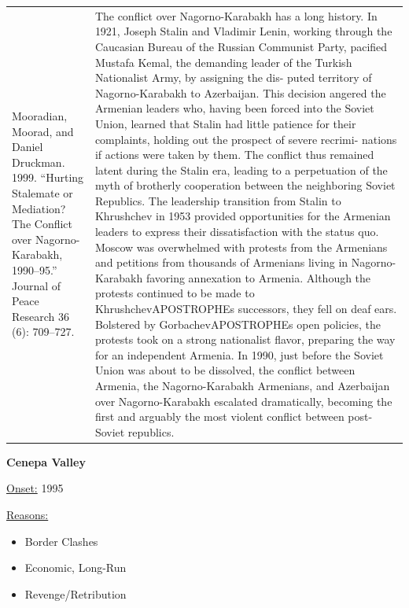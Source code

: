 {\begin{longtable}{p{}p{}}
Mooradian, Moorad, and Daniel Druckman. 1999. “Hurting Stalemate or Mediation? The Conflict over Nagorno-Karabakh, 1990–95.” Journal of Peace Research 36 (6): 709–727. & The conflict over Nagorno-Karabakh has a long history. In 1921, Joseph Stalin and Vladimir Lenin, working through the Caucasian Bureau of the Russian Communist Party, pacified Mustafa Kemal, the demanding leader of the Turkish Nationalist Army, by assigning the dis- puted territory of Nagorno-Karabakh to Azerbaijan. This decision angered the Armenian leaders who, having been forced into the Soviet Union, learned that Stalin had little patience for their complaints, holding out the prospect of severe recrimi- nations if actions were taken by them. The conflict thus remained latent during the Stalin era, leading to a perpetuation of the myth of brotherly cooperation between the neighboring Soviet Republics. The leadership transition from Stalin to Khrushchev in 1953 provided opportunities for the Armenian leaders to express their dissatisfaction with the status quo. Moscow was overwhelmed with protests from the Armenians and petitions from thousands of Armenians living in Nagorno-Karabakh favoring annexation to Armenia. Although the protests continued to be made to KhrushchevAPOSTROPHEs successors, they fell on deaf ears. Bolstered by GorbachevAPOSTROPHEs open policies, the protests took on a strong nationalist flavor, preparing the way for an independent Armenia. In 1990, just before the Soviet Union was about to be dissolved, the conflict between Armenia, the Nagorno-Karabakh Armenians, and Azerbaijan over Nagorno-Karabakh escalated dramatically, becoming the first and arguably the most violent conflict between post-Soviet republics.
\\
\end{longtable}}
\clearpage
         \textbf{Cenepa Valley} 

          \underline{Onset:} 1995         

\underline{Reasons:}
\begin{itemize}
\item Border Clashes
\item Economic, Long-Run
\item Revenge/Retribution
\end{itemize}

